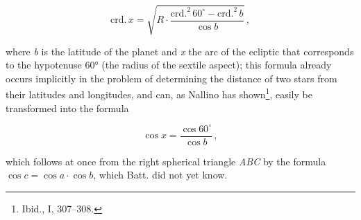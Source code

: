 \documentclass[11pt]{article}
\begin{document}
\par\smallskip\[\mathrm{crd.}\,x = \sqrt{R\cdot\frac{\mathrm{crd.}^{2}\,60^{\circ}-\mathrm{crd.}^{2}\,b}{\cos b}}\,,\]\par\smallskip
\par where \emph{b} is the latitude of the planet and \emph{x} the arc of the ecliptic that corresponds to the hypotenuse 60° (the radius of the sextile aspect); this formula already occurs implicitly in the problem of determining the distance of two stars from their latitudes and longitudes, and can, as Nallino has shown\footnote{Ibid., I, 307–308.}, easily be transformed into the formula\par
\par\smallskip\[\cos x = \frac{\cos 60^{\circ}}{\cos b}\,,\]\par\smallskip
\par which follows at once from the right spherical triangle \emph{ABC} by the formula $\cos c = \cos a\cdot\cos b$, which Batt. did not yet know.\par
\end{document}
